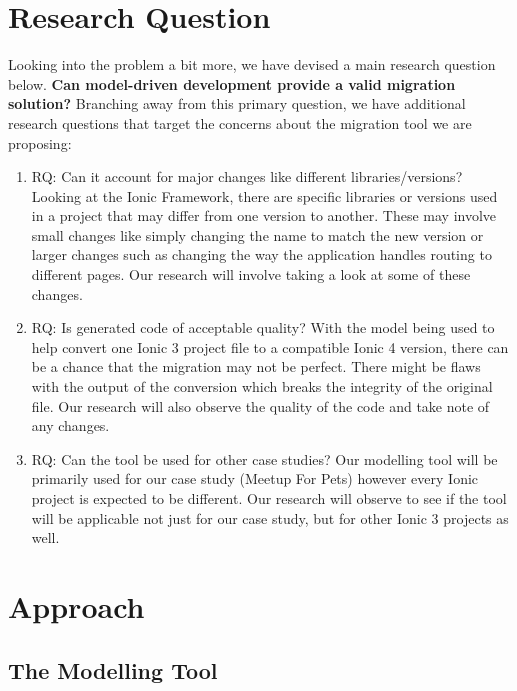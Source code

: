 \documentclass[conference]{IEEEtran}
\begin{document}
\section{Research Question}
Looking into the problem a bit more, we have devised a main research question below.
\newline \newline \textbf{Can model-driven development provide a valid migration solution?}
\newline \newline Branching away from this primary question, we have additional research questions that target the concerns about the migration tool we are proposing:
\begin{enumerate}
    \item RQ: Can it account for major changes like different libraries/versions?
    \newline Looking at the Ionic Framework, there are specific libraries or versions used in a project that may differ from one version to another.
    These may involve small changes like simply changing the name to match the new version or larger changes such as changing the way the application handles routing to different pages.
    Our research will involve taking a look at some of these changes.
    \item RQ: Is generated code of acceptable quality?
    \newline With the model being used to help convert one Ionic 3 project file to a compatible Ionic 4 version, there can be a chance that the migration may not be perfect.
    There might be flaws with the output of the conversion which breaks the integrity of the original file. Our research will also observe the quality of the code and take note of any changes.
    \item RQ: Can the tool be used for other case studies?
    \newline Our modelling tool will be primarily used for our case study (Meetup For Pets) however every Ionic project is expected to be different.
    Our research will observe to see if the tool will be applicable not just for our case study, but for other Ionic 3 projects as well.
\end{enumerate}

\section{Approach}
\subsection{The Modelling Tool}
\end{document}
